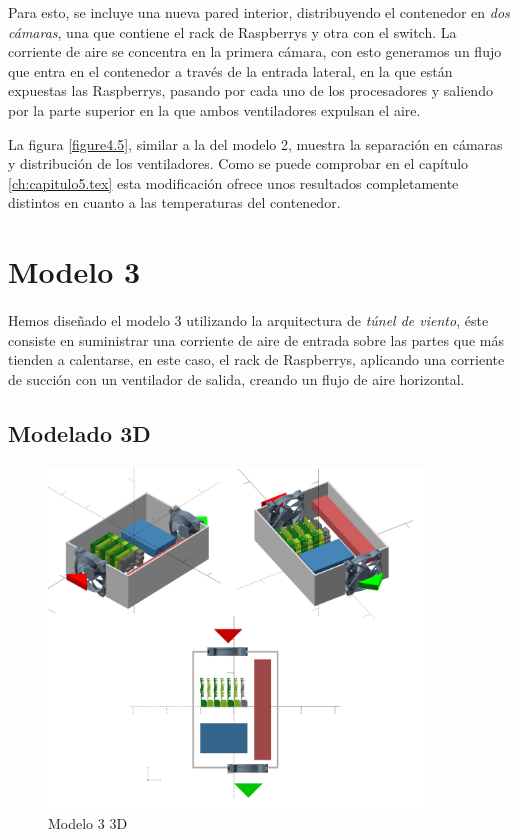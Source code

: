 Para esto, se incluye una nueva pared interior, distribuyendo el contenedor en \textit{dos cámaras}, una que contiene el rack de Raspberrys y otra con el switch. La corriente de aire se concentra en la primera cámara, con esto generamos un flujo que entra en el contenedor a través de la entrada lateral, en la que están expuestas las Raspberrys, pasando por cada uno de los procesadores y saliendo por la parte superior en la que ambos ventiladores expulsan el aire.

La figura \ref{figure4.5}, similar a la del modelo 2, muestra la separación en cámaras y distribución de los ventiladores.
Como se puede comprobar en el capítulo \ref{ch:capitulo5.tex} esta modificación ofrece unos resultados completamente distintos en cuanto a las temperaturas del contenedor.


\section{Modelo 3}
\label{makereference4.6}
\paragraph{}

Hemos diseñado el modelo 3 utilizando la arquitectura de \textit{túnel de viento}, éste consiste en suministrar una corriente de aire de entrada sobre las partes que más tienden a calentarse, en este caso, el rack de Raspberrys, aplicando una corriente de succión con un ventilador de salida, creando un flujo de aire horizontal. 
 
\subsection{Modelado 3D}
\paragraph{}

\begin{figure}[H]
	\centering
  	\includegraphics[width=100mm]{Modelos/M3X.png}
   	\caption[Modelo Modelo 3 3D]{Modelo 3 3D}
   \label{figure4.6}
\end{figure}


